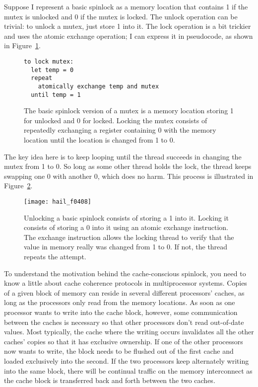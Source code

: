 Suppose I represent a basic spinlock as a memory location that contains 1 if
the mutex is unlocked and 0 if the mutex is locked.  The unlock
operation can be trivial: to unlock a mutex, just store 1 into it.
The lock operation is a bit trickier and uses the atomic exchange
operation; I can express it in pseudocode, as shown in
Figure~\ref{basic-spinlock-lock}.
\begin{figure}
\begin{verbatim}
to lock mutex:
  let temp = 0
  repeat
    atomically exchange temp and mutex
  until temp = 1
\end{verbatim}
\caption{The basic spinlock version of a mutex is a memory location
  storing 1 for unlocked and 0 for locked.  Locking the mutex consists of
  repeatedly exchanging a register containing 0 with the memory
  location until the location is changed from 1 to 0.}
\label{basic-spinlock-lock}
\end{figure}
The key idea here is to keep looping until the thread succeeds in changing the
mutex from 1 to 0.  So long as some other thread holds the
lock, the thread keeps swapping one 0 with another 0, which does no harm.
This process is illustrated in Figure~\ref{scan-4-4}.
\begin{figure}
\centerline{\texttt{[image: hail\_f0408]}}
\caption{Unlocking a basic spinlock consists of storing a 1 into it.
  Locking it consists of storing a 0 into it using an atomic exchange
  instruction.  The exchange instruction allows the locking thread to verify that the
  value in memory really was changed from 1 to 0.  If not, the thread
  repeats the attempt.}
\label{scan-4-4}
\end{figure}

To understand the motivation behind the cache-conscious spinlock, you need to
know a little about cache coherence
protocols in multiprocessor
systems.  Copies of a given block of memory can reside in several
different processors' caches, as long as the processors only read from the
memory locations.  As soon as one processor wants to write into the
cache block, however, some communication between the caches is
necessary so that other processors don't read out-of-date
values.  Most typically, the cache where the writing occurs invalidates all the other caches' copies so
that it has exclusive ownership.  If one of the other processors now
wants to write, the block needs to be flushed out of the first cache
and loaded exclusively into the second.  If the two processors keep
alternately writing into the same block, there will be continual
traffic on the memory interconnect as the cache block is transferred
back and forth between the two caches.

